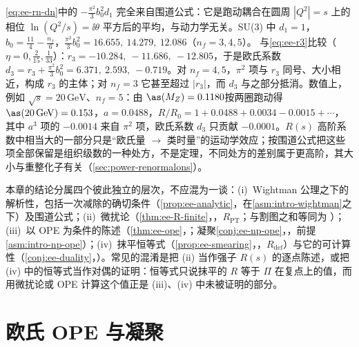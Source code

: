 \begin{example}[$O(a^3)$ 的 $\pi^2$ 项]\label{ex:ee-pi2}
\cref{eq:ee-rn-dn}中的 $-\frac{\pi^2}3b_0^2d_1$ 完全来自围道公式：它是跑动耦合在圆周 $|Q^2|=s$ 上的相位 $\ln(Q^2/s)=\ii\theta$ 平方后的平均，与动力学无关。SU(3) 中 $d_1=1$，$b_0=\frac{11}4-\frac{n_f}6$，$\frac{\pi^2}3b_0^2=16.655,\ 14.279,\ 12.086$（$n_f=3,4,5$）。%
与\cref{eq:ee-r3}比较（$\eta=0,\frac2{15},\frac1{33}$）：$r_3=-10.284,\ -11.686,\ -12.805$，于是欧氏系数 $d_3=r_3+\frac{\pi^2}3b_0^2=6.371,\ 2.593,\ -0.719$。对 $n_f=4,5$，$\pi^2$ 项与 $r_3$ 同号、大小相近，构成 $r_3$ 的主体；对 $n_f=3$ 它甚至超过 $|r_3|$，而 $d_3$ 与之部分抵消。数值上，例如 $\sqrt s=20\,\mathrm{GeV}$、$n_f=5$：由 $\as(M_Z)=0.1180$\cite[式~(9.25)]{ParticleDataGroup:2024cfk}按两圈跑动得 $\as(20\,\mathrm{GeV})=0.153$，$a=0.0488$，$R/R_0=1+0.0488+0.0034-0.0015+\cdots$，其中 $a^3$ 项的 $-0.0014$ 来自 $\pi^2$ 项，欧氏系数 $d_3$ 只贡献 $-0.0001$。$R(s)$ 高阶系数中相当大的一部分只是“欧氏量 $\to$ 类时量”的运动学效应\cite{KrasnikovPivovarov1982,KataevStarshenko1995}；按围道公式把这些项全部保留是组织级数的一种处方，不是定理，不同处方的差别属于更高阶，其大小与重整化子有关（\cref{sec:power-renormalons}）。
\end{example}

\begin{remark}[四个逻辑层次]\label{rem:ee-status-layout}
本章的结论分属四个彼此独立的层次，不应混为一谈：(i)~Wightman 公理之下的解析性，包括一次减除的确切条件（\cref{prop:ee-analytic}，在\cref{asm:intro-wightman}之下）及围道公式；(ii)~微扰论（\cref{thm:ee-R-finite}，\tagR，$R_{\mathrm{PT}}$；与割图之和等同为 \tagA）；(iii)~以 OPE 为条件的陈述（\cref{thm:ee-ope}，\tagA；凝聚\cref{conj:ee-np-ope}，\tagC，前提\cref{asm:intro-np-ope}）；(iv)~抹平恒等式（\cref{prop:ee-smearing}，\tagR，$R_{\mathrm{def}}$）与它的可计算性（\cref{conj:ee-duality}，\tagC）。常见的混淆是把 (ii) 当作强子 $R(s)$ 的逐点陈述，或把 (iv) 中的恒等式当作对偶的证明：恒等式只说抹平的 $R$ 等于 $\Pi$ 在复点上的值，而用微扰论或 OPE 计算这个值正是 (iii)、(iv) 中未被证明的部分。
\end{remark}

\section{欧氏 OPE 与凝聚}\label{sec:ee-ope}

